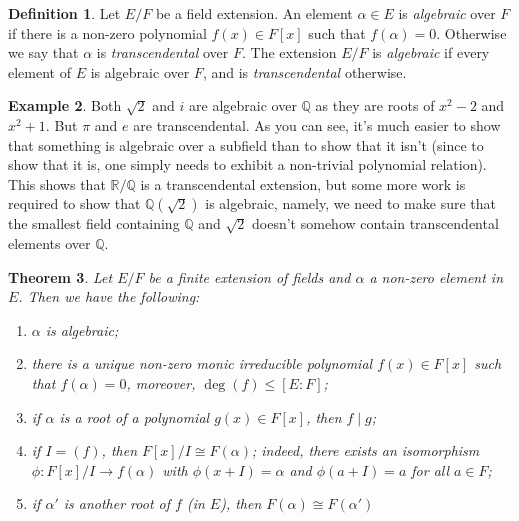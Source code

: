 \documentclass[12pt]{report}
\newtheorem{thm}{Theorem}[section]
\theoremstyle{definition}
\newtheorem{defn}[thm]{Definition}
\newtheorem{example}[thm]{Example}
\def\QQ{\mathbb{Q}}
\def\RR{\mathbb{R}}
\def\aa{\alpha}
\begin{document}
\begin{defn}
    Let $E/F$ be a field extension. An element $\aa\in E$ is \emph{algebraic} over $F$ if there is a non-zero polynomial $f(x) \in F[x]$ such that $f(\aa) = 0$. Otherwise we say that $\aa$ is \emph{transcendental} over $F$. The extension $E/F$ is \emph{algebraic} if every element of $E$ is algebraic over $F$, and is \emph{transcendental} otherwise.
\end{defn}

\begin{example}
    Both $\sqrt{2}$ and $i$ are algebraic over $\QQ$ as they are roots of $x^2-2$ and $x^2+1$.  But $\pi$ and $e$ are transcendental. As you can see, it's much easier to show that something is algebraic over a subfield than to show that it isn't (since to show that it is, one simply needs to exhibit a non-trivial
    polynomial relation). This shows that $\RR/\QQ$ is a transcendental extension, but some more work is required to show that $\QQ(\sqrt{2})$ is algebraic, namely, we need to make sure that the smallest
    field containing $\QQ$ and $\sqrt{2}$ doesn't somehow contain transcendental elements over $\QQ$.
\end{example}

\begin{thm}\label{minimal}
    Let $E/F$ be a finite extension of fields and $\aa$ a non-zero element in $E$. Then we have the following:
    \begin{enumerate}
        \item $\aa$ is algebraic;
        \item there is a unique non-zero monic irreducible polynomial $f(x) \in F[x]$ such that $f(\aa) = 0$, moreover, $\deg(f)\leq [E:F]$;
        \item if $\aa$ is a root of a polynomial $g(x)\in F[x]$, then $f\mid g$;
        \item if $I=(f)$, then $F[x]/I \cong F(\aa)$; indeed, there exists an isomorphism $\phi: F[x]/I \to f(\aa)$ with $\phi(x+I)=\alpha$ and $\phi(a+I)=a$ for all $a\in F$;
        \item if $\aa'$ is another root of $f$ (in $E$), then $F(\aa)\cong F(\aa')$
    \end{enumerate}
\end{thm}
\end{document}
